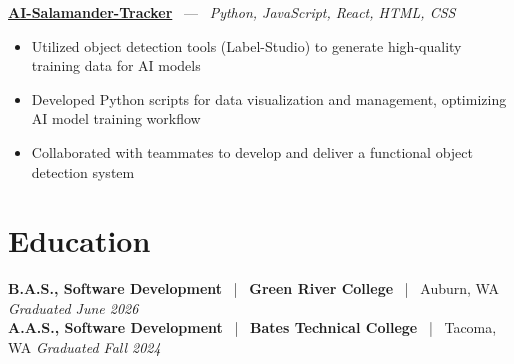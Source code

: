 \documentclass[10pt, letterpaper]{article}
\newcommand{\jobhead}[4]{%
  \vspace{5pt}%
  {\bfseries\color{dark}#1}%
  ~{\color{light}|}~%
  {\bfseries\color{navy}#2}%
  ~{\color{light}|}~%
  {\color{light}#3}%
  \hfill{\color{light}\small\textit{#4}}\\[-2pt]%
}
\newcommand{\projhead}[3]{%
  \vspace{5pt}%
  {\bfseries\color{dark}\href{#2}{#1}}%
  ~{\color{light}---}~%
  {\color{light}\small\textit{#3}}\\[-2pt]%
}
\begin{document}
\projhead{AI-Salamander-Tracker}{https://github.com/xavierb117/Salamander-Tracker-YOLO}{Python, JavaScript, React, HTML, CSS}
\begin{itemize}
  \item Utilized object detection tools (Label-Studio) to generate high-quality training data for AI models
  \item Developed Python scripts for data visualization and management, optimizing AI model training workflow
  \item Collaborated with teammates to develop and deliver a functional object detection system
\end{itemize}

\section{Education}

\jobhead{B.A.S., Software Development}{Green River College}{Auburn, WA}{Graduated June 2026}
\jobhead{A.A.S., Software Development}{Bates Technical College}{Tacoma, WA}{Graduated Fall 2024}
\end{document}
